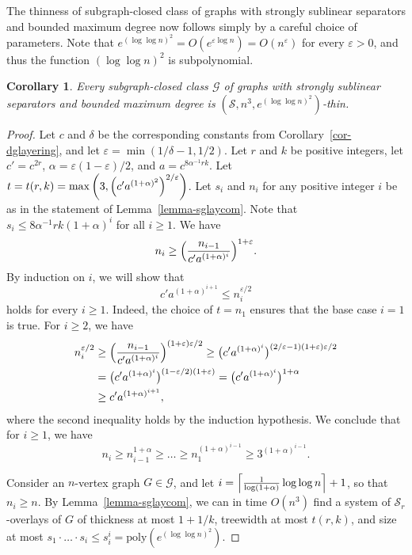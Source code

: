 \documentclass[a4paper,11pt]{article}
\newcommand{\GG}{{\mathcal G}}
\newcommand{\Ss}{{\mathcal S}}
\newcommand{\poly}{\text{poly}}
\newtheorem{corollary}[theorem]{Corollary}
\begin{document}
The thinness of subgraph-closed class of graphs with strongly sublinear separators and bounded maximum degree
now follows simply by a careful choice of parameters.  Note that $e^{(\log\log n)^2}=O(e^{\varepsilon \log n})=O(n^\varepsilon)$
for every $\varepsilon>0$, and thus the function $(\log\log n)^2$ is subpolynomial.

\begin{corollary}\label{cor-sublin}
Every subgraph-closed class $\GG$ of graphs with strongly sublinear separators and bounded maximum degree is $(\Ss,n^3,e^{(\log\log n)^2})$-thin.
\end{corollary}
\begin{proof}
Let $c$ and $\delta$ be the corresponding constants from Corollary~\ref{cor-dglayering}, and let $\varepsilon = \min(1/\delta - 1,1/2)$.
Let $r$ and $k$ be positive integers, let $c'=c^{2r}$, $\alpha=\varepsilon(1-\varepsilon)/2$, and $a=c^{8\alpha^{-1}rk}$.
Let $t=t(r,k)=\max\left(3,\Bigl(c'a^{(1+\alpha)^2}\Bigr)^{2/\varepsilon}\right)$.
Let $s_i$ and $n_i$ for any positive integer $i$ be as in the statement of Lemma~\ref{lemma-sglaycom}.
Note that $s_i\le 8\alpha^{-1}rk(1+\alpha)^i$ for all $i\ge 1$.
We have
$$n_i\ge \Bigl(\frac{n_{i-1}}{c'a^{(1+\alpha)^i}}\Bigr)^{1+\varepsilon}.$$
By induction on $i$, we will show that $$c'a^{(1+\alpha)^{i+1}}\le n_i^{\varepsilon/2}$$
holds for every $i\ge 1$.  Indeed, the choice of $t=n_1$ ensures that the base case $i=1$ is true.
For $i\ge 2$, we have
\begin{align*}
n_i^{\varepsilon/2}&\ge \Bigl(\frac{n_{i-1}}{c'a^{(1+\alpha)^i}}\Bigr)^{(1+\varepsilon)\varepsilon/2}\ge \bigl(c'a^{(1+\alpha)^i}\bigr)^{(2/\varepsilon-1)(1+\varepsilon)\varepsilon/2}\\
&=\bigl(c'a^{(1+\alpha)^i}\bigr)^{(1-\varepsilon/2)(1+\varepsilon)}=\bigl(c'a^{(1+\alpha)^i}\bigr)^{1+\alpha}\\
&\ge c'a^{(1+\alpha)^{i+1}},
\end{align*}
where the second inequality holds by the induction hypothesis.  We conclude that for $i\ge 1$, we have
$$n_i\ge n_{i-1}^{1+\alpha}\ge \ldots\ge n_1^{(1+\alpha)^{i-1}}\ge 3^{(1+\alpha)^{i-1}}.$$

Consider an $n$-vertex graph $G\in \GG$, and let $i=\Bigl\lceil\frac{1}{\log(1+\alpha)}\log\log n\Bigr\rceil+1$,
so that $n_i\ge n$.  By Lemma~\ref{lemma-sglaycom}, we can in time $O(n^3)$ find a system of $\Ss_r$-overlays of $G$ of thickness at most $1+1/k$,
treewidth at most $t(r,k)$, and size at most $s_1\cdot\ldots\cdot s_i\le s_i^i=\poly(e^{(\log\log n)^2})$.
\end{proof}



\end{document}
